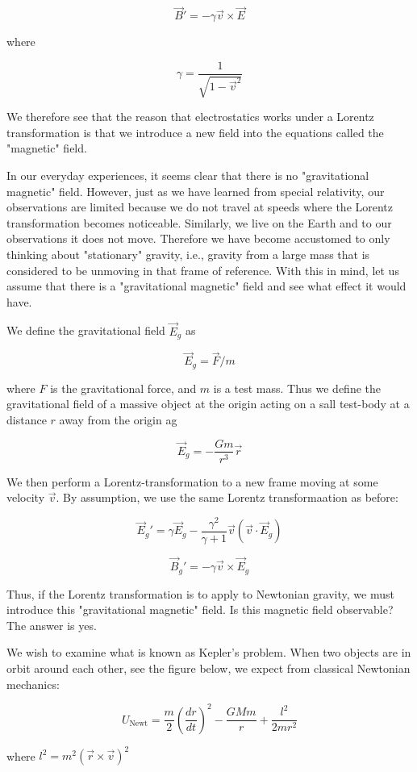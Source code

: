 \documentclass {article}
\begin{document}
$$ \vec B' = - \gamma \vec v \times \vec E$$

where 

$$ \gamma = \frac 1 {\sqrt{1 - \vec v^ 2} } $$ 

We therefore see that the reason that electrostatics works under a Lorentz transformation is that we introduce a new field into the equations called the "magnetic" field.

In our everyday experiences, it seems clear that there is no "gravitational magnetic" field. However, just as we have learned from special relativity, our observations are limited because we do not travel at speeds where the Lorentz transformation becomes noticeable. Similarly, we live on the Earth and to our observations it does not move. Therefore we have become accustomed to only thinking about "stationary" gravity, i.e., gravity from a large mass that is considered to be unmoving in that frame of reference. With this in mind, let us assume that there is a "gravitational magnetic" field and see what effect it would have.

We define the gravitational field $\vec E_g $ as

$$ \vec E_g = \vec F / m $$

where $F$ is the gravitational force, and $m$ is a test mass. Thus we define the gravitational field of a massive object at the origin acting on a sall test-body at a distance $r$ away from the origin ag

$$\vec E_g = - \frac {Gm} {r^3} \vec r $$

We then perform a Lorentz-transformation to a new frame moving at some velocity $\vec v$. By assumption, we use the same Lorentz transformaation as before:

$$\vec E_g' = \gamma \vec E_g - \frac {\gamma^2} {\gamma + 1} \vec v (\vec v \cdot \vec E_g) $$

$$ \vec B_g' = - \gamma \vec v \times \vec E_g$$

Thus, if the Lorentz transformation is to apply to Newtonian gravity, we must introduce this "gravitational magnetic" field. Is this magnetic field observable? The answer is yes.

We wish to examine what is known as  Kepler's problem. When two objects are in orbit around each other, see the figure below, we expect from classical Newtonian mechanics:

$$ U_{\text{Newt}} = \frac m 2 (\frac {dr} {dt})^2 - \frac {GMm} r + \frac {l^2} {2mr^2}$$

where $l^2 = m^2 (\vec r \times \vec v)^2$
\end{document}
